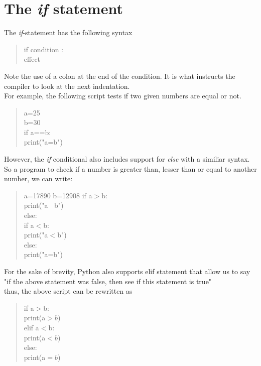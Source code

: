 \section{The \emph{if} statement}
The \emph{if}-statement has the following syntax
\begin{quote}
if condition :\\
\tab effect
\end{quote}
Note the use of a colon at the end of the condition. It is what instructs the compiler to look at the next indentation.\\
For example,  the following script tests if two given numbers are equal or not.
\begin{quote}
a=25\\
b=30\\
if a==b:\\
\tab print("a=b")
\end{quote}
However, the \emph{if} conditional also includes support for \emph{else} with a similiar syntax.\\
So a program to check if a number is greater than, lesser than or equal to another number, we can write:
\begin{quote}
a=17890
b=12908
if a$>$b:\\
\tab print("a $\>$ b")\\
else:\\ 
\tab if a$<$b:\\
\tab \tab print("a$<$b")\\
else:\\
\tab print("a=b")
\end{quote}
For the sake of brevity, Python also supports elif statement that allow us to say "if the above statement was false, then see if this statement is true"\\
thus, the above script can be rewritten as 
\begin{quote}
if a$>$b:\\
\tab print(a$>b$)\\
elif a$<$b:\\
\tab print(a$<b$)\\
else:\\
\tab print(a$=b$)
\end{quote}
